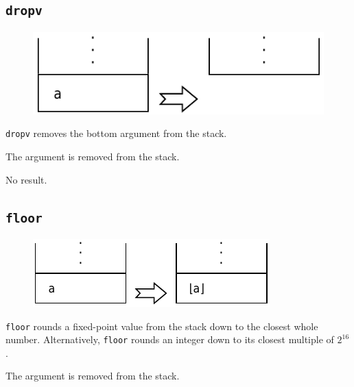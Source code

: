 \newpage
	
	\subsection*{\texttt{dropv}}
	
		\begin{figure}
			\begin{flushright}
				\includegraphics[width=\linewidth]{figure/pdf/i_dropv} 
			\end{flushright}
		\end{figure}

			\texttt{dropv} removes the bottom argument from the stack.

			The argument is removed from the stack.

			No result.

	\qquad

	\subsection*{\texttt{floor}}
	
		\begin{figure}
			\begin{flushright}
				\includegraphics[width=\linewidth]{figure/pdf/i_floor} 
			\end{flushright}
		\end{figure}
	
			\texttt{floor} rounds a fixed-point value from the stack down to
			the closest whole number. Alternatively, \texttt{floor} rounds an
			integer down to its closest multiple of $2^{16}$.		
	
			The argument is removed from the stack.
			
